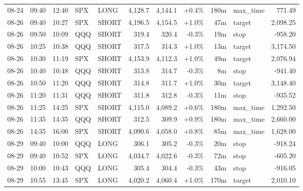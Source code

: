 \documentclass[11pt,a4paper,twoside]{article}
\begin{document}
\begin{center}
\begin{longtable}{>{\color{txtmain}}l l l l l r r r r >{\color{txtmain}}l r}
08-24 & 09:40 & 12:40 & SPX & LONG & 4,128.7 & 4,144.1 & \textcolor{wingreen}{+0.4\%} & 180m & max\_time & \textcolor{wingreen}{771.49} \\
08-26 & 09:40 & 10:27 & SPX & SHORT & 4,196.5 & 4,154.5 & \textcolor{wingreen}{+1.0\%} & 47m & target & \textcolor{wingreen}{2,098.25} \\
08-26 & 09:50 & 10:09 & QQQ & SHORT & 319.4 & 320.4 & \textcolor{lossred}{-0.3\%} & 19m & stop & \textcolor{lossred}{-958.20} \\
08-26 & 10:25 & 10:38 & QQQ & SHORT & 317.5 & 314.3 & \textcolor{wingreen}{+1.0\%} & 13m & target & \textcolor{wingreen}{3,174.50} \\
08-26 & 10:30 & 11:19 & SPX & SHORT & 4,153.9 & 4,112.3 & \textcolor{wingreen}{+1.0\%} & 49m & target & \textcolor{wingreen}{2,076.94} \\
08-26 & 10:40 & 10:48 & QQQ & SHORT & 313.8 & 314.7 & \textcolor{lossred}{-0.3\%} & 8m & stop & \textcolor{lossred}{-941.40} \\
08-26 & 10:50 & 11:20 & QQQ & SHORT & 314.8 & 311.7 & \textcolor{wingreen}{+1.0\%} & 30m & target & \textcolor{wingreen}{3,148.40} \\
08-26 & 11:20 & 11:31 & QQQ & SHORT & 311.8 & 312.8 & \textcolor{lossred}{-0.3\%} & 11m & stop & \textcolor{lossred}{-935.52} \\
08-26 & 11:25 & 14:25 & SPX & SHORT & 4,115.0 & 4,089.2 & \textcolor{wingreen}{+0.6\%} & 180m & max\_time & \textcolor{wingreen}{1,292.50} \\
08-26 & 11:35 & 14:35 & QQQ & SHORT & 312.5 & 309.9 & \textcolor{wingreen}{+0.9\%} & 180m & max\_time & \textcolor{wingreen}{2,660.00} \\
08-26 & 14:35 & 16:00 & SPX & SHORT & 4,090.6 & 4,058.0 & \textcolor{wingreen}{+0.8\%} & 85m & max\_time & \textcolor{wingreen}{1,628.00} \\
08-29 & 09:40 & 10:00 & QQQ & LONG & 306.1 & 305.2 & \textcolor{lossred}{-0.3\%} & 20m & stop & \textcolor{lossred}{-918.24} \\
08-29 & 09:40 & 10:52 & SPX & LONG & 4,034.7 & 4,022.6 & \textcolor{lossred}{-0.3\%} & 72m & stop & \textcolor{lossred}{-605.20} \\
08-29 & 10:00 & 10:43 & QQQ & LONG & 305.4 & 304.4 & \textcolor{lossred}{-0.3\%} & 43m & stop & \textcolor{lossred}{-916.05} \\
08-29 & 10:55 & 13:45 & SPX & LONG & 4,020.2 & 4,060.4 & \textcolor{wingreen}{+1.0\%} & 170m & target & \textcolor{wingreen}{2,010.10} \\

\end{longtable}
\end{center}
\end{document}
